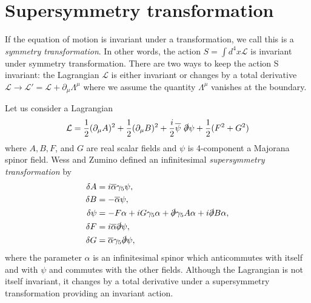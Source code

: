 \documentclass[12pt]{report}
\begin{document}
\section{Supersymmetry transformation}
If the equation of motion is invariant under a transformation, we call this is a \textit{symmetry transformation}.
In other words, the action $S = \int d^{4}x \mathcal{L}$ is invariant under symmetry transformation.
There are two ways to keep the action S invariant: the Lagrangian $\mathcal{L}$ is either invariant or changes by a total derivative $\mathcal{L} \to \mathcal{L}' = \mathcal{L} + \partial_{\mu} \Lambda^{\mu}$ where we assume the quantity $\Lambda^{\mu}$ vanishes at the boundary.

Let us consider a Lagrangian
\begin{equation}
\mathcal{L} = \frac{1}{2} (\partial_{\mu} A)^{2} + \frac{1}{2} (\partial_{\mu} B)^{2} + \frac{i}{2} \overline{\psi} \ \slashed{\partial} \psi + \frac{1}{2} (F^{2} + G^{2})
\end{equation}
where $A, B, F$, and $G$ are real scalar fields and $\psi$ is 4-component a Majorana spinor field.
Wess and Zumino \cite{wess_and_zumino} defined an infinitesimal \textit{supersymmetry transformation} by
\begin{align}
\delta A &= i \overline{\alpha} \gamma_{5} \psi ,\label{eq: 3.2}\\
\delta B &= - \overline{\alpha} \psi ,\\
\delta \psi &= -F \alpha + i G \gamma_{5} \alpha + \slashed{\partial} \gamma_{5} A \alpha + i \slashed{\partial} B \alpha ,\\
\delta F &= i \overline{\alpha} \slashed{\partial} \psi ,\\
\delta G &= \overline{\alpha} \gamma_{5} \slashed{\partial} \psi \label{eq: 3.6},
\end{align}
where the parameter $\alpha$ is an infinitesimal spinor which anticommutes with itself and with $\psi$ and commutes with the other fields.
Although the Lagrangian is not itself invariant, it changes by a total derivative under a supersymmetry transformation providing an invariant action.
\end{document}
